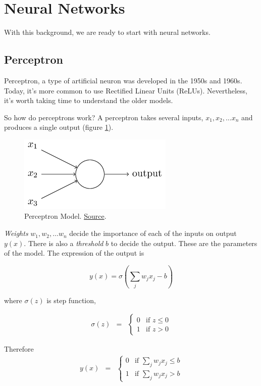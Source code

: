 \documentclass[a4paper]{tufte-handout}
\begin{document}
\section{Neural Networks}\label{neural-networks}

With this background, we are ready to start with neural networks.

\subsection{Perceptron}\label{perceptron}

Perceptron, a type of artificial neuron was developed in the 1950s and
1960s. Today, it's more common to use Rectified Linear Units (ReLUs).
Nevertheless, it's worth taking time to understand the older models.

So how do perceptrons work? A perceptron takes several inputs,
\(x_1, x_2, \ldots x_n\) and produces a single output (figure \ref{fig:percp}).


\begin{figure}
  \includegraphics[width=0.5\linewidth]{tikz0}
  \caption{ Perceptron Model.
\href{http://neuralnetworksanddeeplearning.com/chap1.html}{Source}. }
\label{fig:percp}
\end{figure}


\emph{Weights} \(w_1, w_2, \ldots w_n\) decide the importance of each of
the inputs on output \(y(x)\). There is also a \emph{threshold} \(b\) to
decide the output. These are the parameters of the model.
The expression of the output is

\[ y(x) = \sigma\left(\sum_j w_j x_j - b\right) \]

where \(\sigma(z)\) is step function, 

\begin{eqnarray*}
  \sigma(z) & = & \left\{ \begin{array}{ll}
      0 & \mbox{if } z \leq 0 \\
      1 & \mbox{if } z > 0
      \end{array} \right.
\end{eqnarray*}

Therefore 
\begin{eqnarray*}
    y(x) & = & \left\{ \begin{array}{ll}
      0 & \mbox{if } \sum_j w_j x_j \leq b \\
      1 & \mbox{if } \sum_j w_j x_j > b
      \end{array} \right.
\end{eqnarray*}
\end{document}
